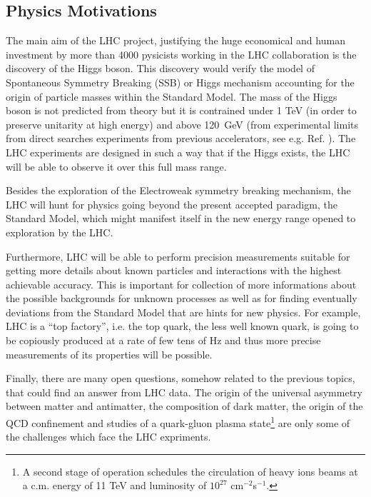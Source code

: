 \subsection{Physics Motivations}\label{sec:physMot}

The main aim of the LHC project, justifying the huge economical and human investment by more than 4000 pysicists working in the LHC collaboration is the discovery of the Higgs boson. This discovery would verify  the model  of Spontaneous Symmetry Breaking (SSB) or Higgs mechanism accounting for the origin of particle masses within the Standard Model. The mass of the Higgs boson is not predicted from theory but it is contrained under 1 TeV (in order to preserve unitarity at high energy) and above 120~GeV (from experimental limits from direct searches experiments from previous accelerators, see e.g. Ref. \cite{Renton}). The LHC experiments are designed in such a way that if the Higgs exists, the LHC will be able to observe it over this full mass range.

Besides the exploration of the Electroweak symmetry breaking mechanism, the LHC will hunt for physics going beyond the present accepted paradigm, the Standard Model, which might manifest itself in the new energy range opened to exploration by the LHC.

Furthermore, LHC will be able to perform precision measurements suitable for getting more details about known particles and interactions with the highest achievable accuracy. This is important for collection of more informations about the possible backgrounds for unknown processes as well as for finding eventually deviations from the Standard Model that are hints for new physics. For example, LHC is a ``top factory'', i.e. the top quark, the less well known quark, is going to be copiously produced at a rate of few tens of Hz and thus more precise measurements of its properties will be possible.

Finally, there are many open questions, somehow related to the previous topics, that could find an answer from LHC data. The origin of the universal asymmetry between matter and antimatter, the composition of dark matter, the origin of the QCD confinement and studies of a quark-gluon plasma state\footnote{A second stage of operation schedules the circulation of heavy ions beams at a c.m. energy of 11 TeV and luminosity of $10^{27}$ cm$^{-2}$s$^{-1}$.} are only some of the challenges which face the LHC expriments.


